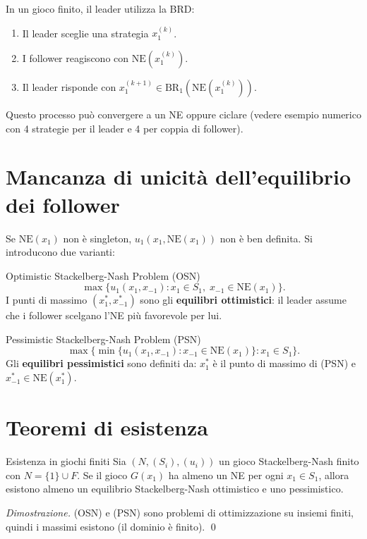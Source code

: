 \documentclass[12pt,a4paper,twoside]{book}
\theoremstyle{plain}
\theoremstyle{definition}
\newcommand{\NE}{\mathrm{NE}}
\newcommand{\BR}{\mathrm{BR}}
\begin{document}
In un gioco finito, il leader utilizza la BRD:
\begin{enumerate}
  \item Il leader sceglie una strategia $x_1^{(k)}$.
  \item I follower reagiscono con $\NE(x_1^{(k)})$.
  \item Il leader risponde con $x_1^{(k+1)}\in\BR_1(\NE(x_1^{(k)}))$.
\end{enumerate}
Questo processo può convergere a un NE oppure ciclare (vedere esempio numerico con 4 strategie per il leader e 4 per coppia di follower).

\section{Mancanza di unicità dell'equilibrio dei follower}

Se $\NE(x_1)$ non è singleton, $u_1(x_1,\NE(x_1))$ non è ben definita. Si introducono due varianti:

\begin{defbox}{Optimistic Stackelberg-Nash Problem (OSN)}
\[
  \max\{u_1(x_1,x_{-1}) : x_1\in S_1,\; x_{-1}\in\NE(x_1)\}. \tag{OSN}
\]
I punti di massimo $(x_1^*,x_{-1}^*)$ sono gli \textbf{equilibri ottimistici}: il leader assume che i follower scelgano l'NE più favorevole per lui.
\end{defbox}

\begin{defbox}{Pessimistic Stackelberg-Nash Problem (PSN)}
\[
  \max\{\min\{u_1(x_1,x_{-1}) : x_{-1}\in\NE(x_1)\} : x_1\in S_1\}. \tag{PSN}
\]
Gli \textbf{equilibri pessimistici} sono definiti da: $x_1^*$ è il punto di massimo di (PSN) e $x_{-1}^*\in\NE(x_1^*)$.
\end{defbox}

\section{Teoremi di esistenza}

\begin{thmbox}{Esistenza in giochi finiti}
Sia $(N,(S_i),(u_i))$ un gioco Stackelberg-Nash finito con $N=\{1\}\cup F$. Se il gioco $G(x_1)$ ha almeno un NE per ogni $x_1\in S_1$, allora esistono almeno un equilibrio Stackelberg-Nash ottimistico e uno pessimistico.
\end{thmbox}
\textit{Dimostrazione.} (OSN) e (PSN) sono problemi di ottimizzazione su insiemi finiti, quindi i massimi esistono (il dominio è finito). \qed
\end{document}
